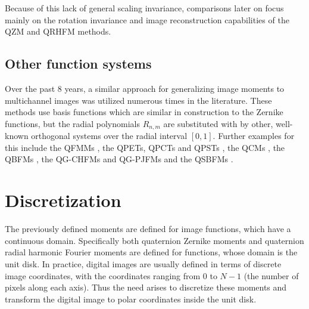 Because of this lack of general scaling invariance, comparisons later on focus mainly on the rotation invariance and image reconstruction capabilities of the QZM and QRHFM methods.


\subsection{Other function systems}
Over the past 8 years, a similar approach for generalizing image moments to multichannel images was utilized numerous times in the literature. These methods use basis functions which are similar in construction to the Zernike functions, but the radial polynomials $R_{n,m}$ are substituted with by other, well-known orthogonal systems over the radial interval $[0,1]$. Further examples for this include the QFMMs \cite{qfmm}, the QPETs, QPCTs and QPSTs \cite{Li}, the QCMs \cite{Guo}, the QBFMs \cite{Shao}, the QG-CHFMs and QG-PJFMs \cite{Singh} and the QSBFMs \cite{Yang}.


\section{Discretization}
The previously defined moments are defined for image functions, which have a continuous domain. Specifically both quaternion Zernike moments and quaternion radial harmonic Fourier moments are defined for functions, whose domain is the unit disk. In practice, digital images are usually defined in terms of discrete image coordinates, with the coordinates ranging from $0$ to $N-1$ (the number of pixels along each axis). Thus the need arises to discretize these moments and transform the digital image to polar coordinates inside the unit disk.


